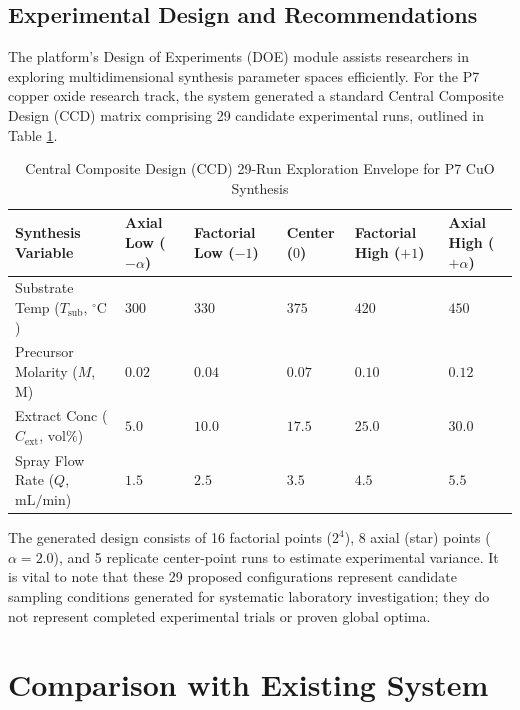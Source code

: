 \documentclass[12pt,a4paper,oneside]{report}
\begin{document}
{{{\subsection{Experimental Design and Recommendations}

The platform's Design of Experiments (DOE) module assists researchers in exploring multidimensional synthesis parameter spaces efficiently. For the P7 copper oxide research track, the system generated a standard Central Composite Design (CCD) matrix comprising 29 candidate experimental runs, outlined in Table \ref{tab:doe_summary}.

\begin{table}[!htbp]
\centering
\scriptsize
\setlength{\tabcolsep}{2.5pt}
\renewcommand{\arraystretch}{1.25}
\caption{Central Composite Design (CCD) 29-Run Exploration Envelope for P7 $\text{CuO}$ Synthesis}
\label{tab:doe_summary}
\begin{tabular}{|p{3.5cm}|p{2.1cm}|p{2.1cm}|p{1.7cm}|p{2.1cm}|p{2.0cm}|}
\hline
\textbf{Synthesis Variable} & \textbf{Axial Low ($-\alpha$)} & \textbf{Factorial Low ($-1$)} & \textbf{Center ($0$)} & \textbf{Factorial High ($+1$)} & \textbf{Axial High ($+\alpha$)} \\
\hline
Substrate Temp ($T_{\text{sub}}$, $^\circ\text{C}$) & $300$ & $330$ & $375$ & $420$ & $450$ \\
Precursor Molarity ($M$, $\text{M}$) & $0.02$ & $0.04$ & $0.07$ & $0.10$ & $0.12$ \\
Extract Conc ($C_{\text{ext}}$, $\text{vol\%}$) & $5.0$ & $10.0$ & $17.5$ & $25.0$ & $30.0$ \\
Spray Flow Rate ($Q$, $\text{mL/min}$) & $1.5$ & $2.5$ & $3.5$ & $4.5$ & $5.5$ \\
\hline
\end{tabular}
\end{table}

The generated design consists of 16 factorial points ($2^4$), 8 axial (star) points ($\alpha = 2.0$), and 5 replicate center-point runs to estimate experimental variance. It is vital to note that these 29 proposed configurations represent candidate sampling conditions generated for systematic laboratory investigation; they do not represent completed experimental trials or proven global optima.

\clearpage
\section{Comparison with Existing System}

}}}
\end{document}
